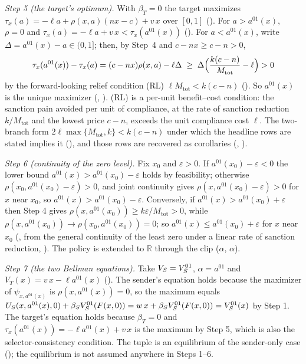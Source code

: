 \emph{Step 5 (the target's optimum).} With $\beta_T=0$ the target maximizes
$\tau_x(a)=-\ell a+\rho(x,a)(nx-c)+v\,x$ over $[0,1]$
(). For $a>a^{01}(x)$, $\rho=0$ and $\tau_x(a)=-\ell a+v\,x<\tau_x(a^{01}(x))$
(). For $a<a^{01}(x)$, write $\Delta=a^{01}(x)-a\in(0,1]$;
then, by Step~4 and $c-nx\ge c-n>0$,
\[
\tau_x(a^{01}(x))-\tau_x(a)=(c-nx)\rho(x,a)-\ell\Delta
\;\ge\;\Delta\Bigl(\frac{k(c-n)}{M_{\mathrm{tot}}}-\ell\Bigr)>0
\]
by the forward-looking relief condition (RL) $\ell M_{\mathrm{tot}}<k(c-n)$
(). So $a^{01}(x)$ is the unique maximizer
(, ). (RL) is
a per-unit benefit--cost condition: the sanction pain avoided per unit of
compliance, at the rate of sanction reduction $k/M_{\mathrm{tot}}$ and the lowest price
$c-n$, exceeds the unit compliance cost $\ell$. The two-branch form
$2\ell\max\{M_{\mathrm{tot}},k\}<k(c-n)$ under which the headline rows are
stated implies it (), and those rows are
recovered as corollaries (, ).

\emph{Step 6 (continuity of the zero level).} Fix $x_0$ and $\varepsilon>0$.
If $a^{01}(x_0)-\varepsilon<0$ the lower bound $a^{01}(x)>a^{01}(x_0)-\varepsilon$
holds by feasibility; otherwise $\rho(x_0,a^{01}(x_0)-\varepsilon)>0$, and joint
continuity gives
$\rho(x,a^{01}(x_0)-\varepsilon)>0$ for $x$ near $x_0$, so $a^{01}(x)>a^{01}(x_0)-\varepsilon$.
Conversely, if $a^{01}(x)>a^{01}(x_0)+\varepsilon$ then Step 4 gives
$\rho(x,a^{01}(x_0))\ge k\varepsilon/M_{\mathrm{tot}}>0$, while
$\rho(x,a^{01}(x_0))\to\rho(x_0,a^{01}(x_0))=0$; so $a^{01}(x)\le a^{01}(x_0)+\varepsilon$ for
$x$ near $x_0$ (, from the general continuity of the
least zero under a linear rate of sanction reduction, ). The policy is extended to
$\mathbb R$ through the clip ($\alpha$, $\alpha$).

\emph{Step 7 (the two Bellman equations).} Take $V_S=V_S^{01}$,
$\alpha=a^{01}$ and $V_T(x)=v\,x-\ell a^{01}(x)$ (). The sender's
equation holds because the maximizer of $\psi_{x,a^{01}(x)}$ is $\rho(x,a^{01}(x))=0$,
so the maximum equals $U_S(x,a^{01}(x),0)+\beta_SV_S^{01}(F(x,0))=w\,x+\beta_SV_S^{01}(F(x,0))=V_S^{01}(x)$
by Step 1. The target's equation holds because $\beta_T=0$ and
$\tau_x(a^{01}(x))=-\ell a^{01}(x)+v\,x$ is the maximum by Step 5, which is also the
selector-consistency condition. The tuple is an equilibrium of the sender-only case
(); the equilibrium is not assumed anywhere in
Steps 1--6.

